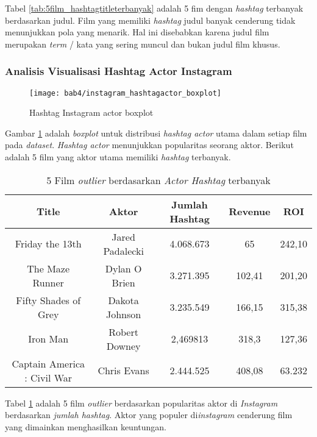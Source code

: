 Tabel \ref{tab:5film_hashtagtitleterbanyak} adalah 5 fim dengan \textit{hashtag} terbanyak berdasarkan judul. Film yang memiliki \textit{hashtag} judul banyak cenderung tidak menunjukkan pola yang menarik. Hal ini disebabkan karena judul film merupakan \textit{term} / kata yang sering muncul dan bukan judul film khusus.

\subsubsection{Analisis Visualisasi Hashtag Actor Instagram}

\begin{figure}[H]
	\centering  
	\texttt{[image: bab4/instagram\_hashtagactor\_boxplot]}   
	\caption{Hashtag Instagram actor boxplot }	\label{fig:instagram_hashtagactor_boxplot} 
\end{figure} 

Gambar \ref{fig:instagram_hashtagactor_boxplot} adalah \textit{boxplot} untuk distribusi \textit{hashtag actor} utama dalam setiap film pada \textit{dataset}. \textit{Hashtag actor} menunjukkan popularitas seorang aktor. Berikut adalah 5 film yang aktor utama memiliki \textit{hashtag} terbanyak.


\begin{table}[H]
\caption{5 Film \textit{outlier} berdasarkan \textit{Actor Hashtag} terbanyak}
\centering
\begin{tabular}{|c|c|c|c|c|}
\hline 
Title & Aktor & Jumlah Hashtag & Revenue & ROI \\ 
\hline 
Friday the 13th & Jared Padalecki & 4.068.673 & 65 & 242,10 \\ 
\hline 
The Maze Runner & Dylan O Brien & 3.271.395 & 102,41 & 201,20 \\ 
\hline 
Fifty Shades of Grey & Dakota Johnson & 3.235.549 & 166,15 & 315,38 \\ 
\hline 
Iron Man & Robert Downey  & 2,469813 & 318,3 & 127,36 \\ 
\hline 
Captain America : Civil War & Chris Evans & 2.444.525 & 408,08 & 63.232 \\ 
\hline 
\end{tabular} 
\label{fig:5terbaik_actorhashtaginstagram}
\end{table}

Tabel \ref{fig:5terbaik_actorhashtaginstagram} adalah 5 film \textit{outlier} berdasarkan popularitas aktor di \textit{Instagram} berdasarkan \textit{jumlah hashtag}. Aktor yang populer di\textit{instagram} cenderung film yang dimainkan menghasilkan keuntungan.

